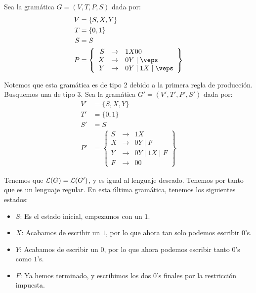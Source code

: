 \begin{ejercicio}
\begin{enumerate}
        Sea la gramática $G=\left(V,T,P,S\right)$ dada por:
        \begin{align*}
            V &= \{S, X, Y\} \\
            T &= \{0,1\} \\
            S &= S \\
            P &= \left\{
                \begin{array}{rcl}
                    S &\rightarrow & 1X00 \\
                    X &\rightarrow & 0Y \mid \veps \\
                    Y &\rightarrow & 0Y \mid 1X \mid \veps \\
                \end{array}
            \right\}
        \end{align*}

        Notemos que esta gramática es de tipo 2 debido a la primera regla de producción. Busquemos una de tipo 3. 
        Sea la gramática $G'=\left(V',T',P',S'\right)$ dada por:
        \begin{align*}
            V' &= \{S, X, Y\} \\
            T' &= \{0,1\} \\
            S' &= S \\
            P' &= \left\{
                \begin{array}{rcl}
                    S &\rightarrow & 1X \\
                    X &\rightarrow & 0Y \mid F \\
                    Y &\rightarrow & 0Y \mid 1X \mid F \\
                    F &\rightarrow & 00
                \end{array}
            \right\}
        \end{align*}

        Tenemos que $\mathcal{L}(G) = \mathcal{L}(G')$, y es igual al lenguaje deseado. Tenemos por tanto que es un lenguaje regular. En esta última gramática, tenemos los siguientes estados:
        \begin{itemize}
            \item $S$: Es el estado inicial, empezamos con un $1$.
            \item $X$: Acabamos de escribir un $1$, por lo que ahora tan solo podemos escribir $0$'s.
            \item $Y$: Acabamos de escribir un $0$, por lo que ahora podemos escribir tanto $0$'s como $1$'s.
            \item $F$: Ya hemos terminado, y escribimos los dos $0$'s finales por la restricción impuesta.
        \end{itemize}
        


\end{enumerate}
\end{ejercicio}
